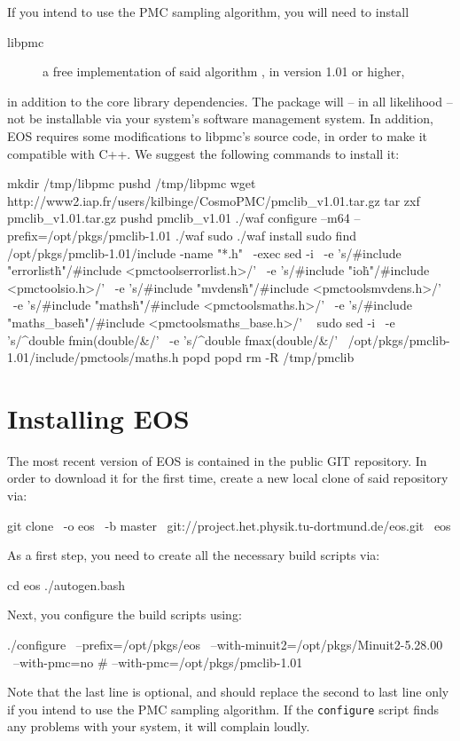 If you intend to use the \gls{PMC} sampling algorithm, you will need to install
\begin{description}
    \item[libpmc] a free implementation of said algorithm \cite{libpmc}, in version 1.01 or higher,
\end{description}
in addition to the core library dependencies. The  package will -- in all likelihood -- not
be installable via your system's software management system. In addition, EOS requires some
modifications to libpmc's source code, in order to make it compatible with C++. We suggest
the following commands to install it:
\begin{commandline}
mkdir /tmp/libpmc
pushd /tmp/libpmc
wget http://www2.iap.fr/users/kilbinge/CosmoPMC/pmclib_v1.01.tar.gz
tar zxf pmclib_v1.01.tar.gz
pushd pmclib_v1.01
./waf configure --m64 --prefix=/opt/pkgs/pmclib-1.01
./waf
sudo ./waf install
sudo find /opt/pkgs/pmclib-1.01/include -name "*.h" \
    -exec sed -i \
    -e 's/#include "errorlist\.h"/#include <pmctools\/errorlist.h>/' \
    -e 's/#include "io\.h"/#include <pmctools\/io.h>/' \
    -e 's/#include "mvdens\.h"/#include <pmctools\/mvdens.h>/' \
    -e 's/#include "maths\.h"/#include <pmctools\/maths.h>/' \
    -e 's/#include "maths_base\.h"/#include <pmctools\/maths_base.h>/' \
    {} \;
sudo sed -i \
    -e 's/^double fmin(double/\/\/&/' \
    -e 's/^double fmax(double/\/\/&/' \
    /opt/pkgs/pmclib-1.01/include/pmctools/maths.h
popd
popd
rm -R /tmp/pmclib
\end{commandline}

\section{Installing EOS}

The most recent version of EOS is contained in the public GIT \cite{GIT} repository.
In order to download it for the first time, create a new local clone of said
repository via:
%
\begin{commandline}
git clone \
    -o eos \
    -b master \
    git://project.het.physik.tu-dortmund.de/eos.git \
    eos
\end{commandline}


As a first step, you need to create all the necessary build scripts via:
%
\begin{commandline}
cd eos
./autogen.bash
\end{commandline}
%
Next, you configure the build scripts using:
%
\begin{commandline}
./configure \
    --prefix=/opt/pkgs/eos \
    --with-minuit2=/opt/pkgs/Minuit2-5.28.00 \
    --with-pmc=no
    # --with-pmc=/opt/pkgs/pmclib-1.01
\end{commandline}
%
Note that the last line is optional, and should replace the second to last line only
if you intend to use the \gls{PMC} sampling algorithm. If the \texttt{configure} script
finds any problems with your system, it will complain loudly.\\

